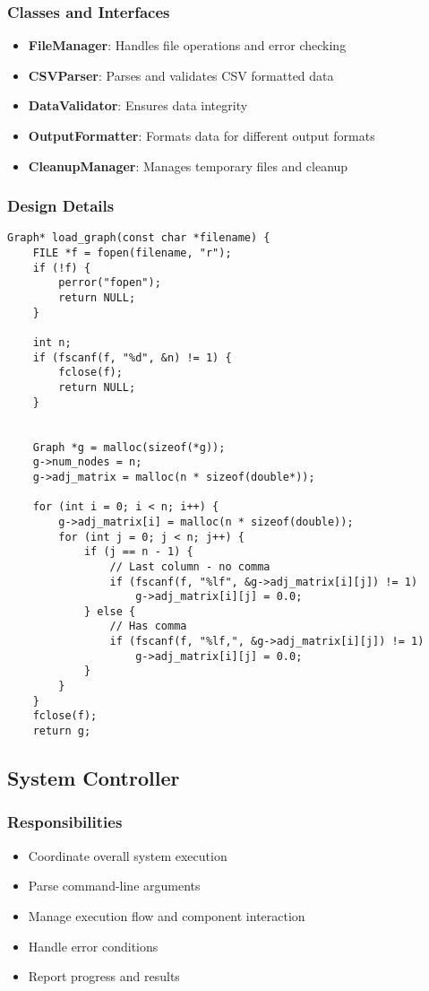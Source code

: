 \documentclass[conference]{IEEEtran}
\begin{document}
\subsubsection{Classes and Interfaces}
\begin{itemize}
    \item \textbf{FileManager}: Handles file operations and error checking
    \item \textbf{CSVParser}: Parses and validates CSV formatted data
    \item \textbf{DataValidator}: Ensures data integrity
    \item \textbf{OutputFormatter}: Formats data for different output formats
    \item \textbf{CleanupManager}: Manages temporary files and cleanup
\end{itemize}

\subsubsection{Design Details}
\begin{lstlisting}[caption=Graph CSV Loading Function]
Graph* load_graph(const char *filename) {
    FILE *f = fopen(filename, "r");
    if (!f) {
        perror("fopen");
        return NULL;
    }

    int n;
    if (fscanf(f, "%d", &n) != 1) {
        fclose(f);
        return NULL;
    }


    Graph *g = malloc(sizeof(*g));
    g->num_nodes = n;
    g->adj_matrix = malloc(n * sizeof(double*));

    for (int i = 0; i < n; i++) {
        g->adj_matrix[i] = malloc(n * sizeof(double));
        for (int j = 0; j < n; j++) {
            if (j == n - 1) {
                // Last column - no comma
                if (fscanf(f, "%lf", &g->adj_matrix[i][j]) != 1)
                    g->adj_matrix[i][j] = 0.0;
            } else {
                // Has comma
                if (fscanf(f, "%lf,", &g->adj_matrix[i][j]) != 1)
                    g->adj_matrix[i][j] = 0.0;
            }
        }
    }
    fclose(f);
    return g;

\end{lstlisting}

\subsection{System Controller}

\subsubsection{Responsibilities}
\begin{itemize}
    \item Coordinate overall system execution
    \item Parse command-line arguments
    \item Manage execution flow and component interaction
    \item Handle error conditions
    \item Report progress and results
\end{itemize}
\end{document}
